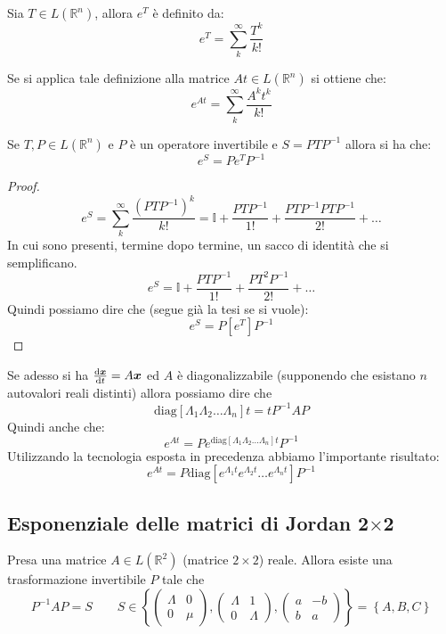 \noindent
\begin{defn}
    Sia $T\in L(\mathbb{R}^n)$, allora $e^T$ è definito da:
    \[
        e^{T}=\sum_{k}^{\infty} \frac{T^{k}}{k!}
    \] 
\end{defn}
\noindent
Se si applica tale definizione alla matrice $At \in L(\mathbb{R}^n)$ si ottiene che:
\[
    e^{At} = \sum_{k}^{\infty} \frac{A^kt^k}{k!}
\] 
\begin{thm}
    Se $T, P \in L(\mathbb{R}^n)$ e $P$ è un operatore invertibile e $S = PTP^{-1}$ allora si ha che:
    \[
        e^{S}=Pe^{T}P^{-1}
    \] 
\end{thm}
\noindent
\begin{proof}
    \[
	e^{S}=\sum_{k}^{\infty} \frac{(PTP^{-1})^k}{k!} = \mathbb{I} + \frac{PTP^{-1}}{1!} + \frac{PTP^{-1} PTP^{-1}}{2!} + \ldots
    \] 
    In cui sono presenti, termine dopo termine, un sacco di identità che si semplificano.
    \[
        e^{S} = \mathbb{I} + \frac{PTP^{-1}}{1!} + \frac{PT^2P^{-1}}{2!} + \ldots
    \] 
    Quindi possiamo dire che (segue già la tesi se si vuole):
    \[
        e^{S}=P\left[e^{T}\right]P^{-1}
    \] 
\end{proof}
\noindent
Se adesso si ha $\frac{\text{d} \boldsymbol{x}}{\text{d} t} = A\boldsymbol{x}$  ed $A $ è diagonalizzabile (supponendo che esistano $n$ autovalori reali distinti) allora possiamo dire che
\[
    \text{diag}\left[\Lambda_1\Lambda_2\ldots \Lambda_n\right]t = t P^{-1}A P
\] 
Quindi anche che:
\[
    e^{At}=P e^{\text{diag}\left[\Lambda_1\Lambda_2\ldots \Lambda_n\right]t}P^{-1}
\] 
Utilizzando la tecnologia esposta in precedenza abbiamo l'importante risultato:
\[
    e^{At} = P \text{diag}\left[e^{\Lambda_1t}e^{\Lambda_2t}\ldots e^{\Lambda_n t}\right] P^{-1}
\] 
\subsection{Esponenziale delle matrici di Jordan 2$\times$2}%
\begin{thm}
    Presa una matrice $A\in L(\mathbb{R}^2)$ (matrice $2\times 2$) reale. Allora esiste una trasformazione invertibile $P$ tale che 
    \[
	P^{-1}AP = S \qquad 
	S \in \left\{
	\begin{pmatrix} \Lambda  & 0 \\ 0 & \mu \end{pmatrix} ,
        \begin{pmatrix} \Lambda  & 1 \\ 0 & \Lambda \end{pmatrix},
        \begin{pmatrix} a & -b \\ b & a \end{pmatrix} \right\} = \left\{A,B,C\right\}
    \] 
\end{thm}
\noindent
